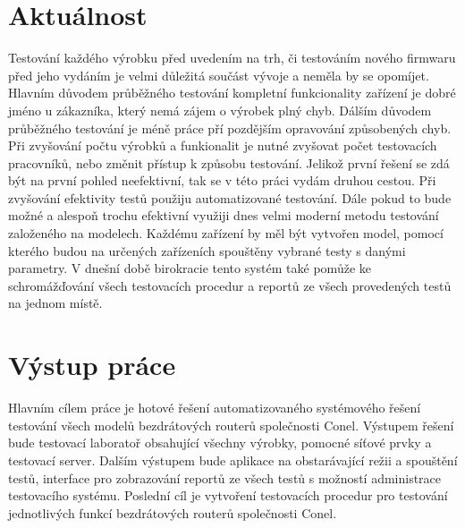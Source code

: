 \section{Aktuálnost}
Testování každého výrobku před uvedením na trh, či testováním nového firmwaru před jeho vydáním je velmi důležitá součást vývoje a neměla by se opomíjet. Hlavním důvodem průběžného testování kompletní funkcionality zařízení je dobré jméno u zákazníka, který nemá zájem o výrobek plný chyb. Dálším důvodem průběžného testování je méně práce pří pozdějším opravování způsobených chyb. Při zvyšování počtu výrobků a funkionalit je nutné zvyšovat počet testovacích pracovníků, nebo změnit přístup k způsobu testování. Jelikož první řešení se zdá být na první pohled neefektivní, tak se v této práci vydám druhou cestou. Při zvyšování efektivity testů použiju automatizované testování. Dále pokud to bude možné a alespoň trochu efektivní využiji dnes velmi moderní metodu testování založeného na modelech. Každému zařízení by měl být vytvořen model, pomocí kterého budou na určených zařízeních spouštěny vybrané testy s danými parametry. V dnešní době birokracie tento systém také pomůže ke schromážďování všech testovacích procedur a reportů ze všech provedených testů na jednom místě.

\section{Výstup práce}
Hlavním cílem práce je hotové řešení automatizovaného systémového řešení testování všech modelů bezdrátových routerů společnosti Conel. Výstupem  řešení bude testovací laboratoř obsahující všechny výrobky, pomocné síťové prvky a testovací server. Dalším výstupem bude aplikace na obstarávající režii a spouštění testů, interface pro zobrazování reportů ze všech testů s možností administrace testovacího systému. Poslední cíl je vytvoření testovacích procedur pro testování jednotlivých funkcí bezdrátových routerů společnosti Conel.

